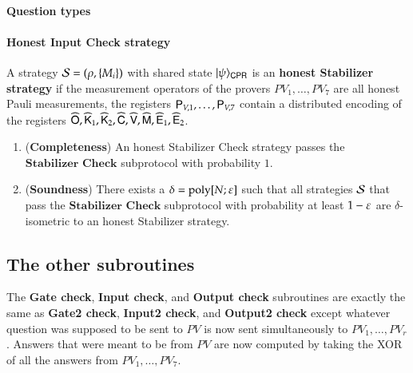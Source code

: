 
\paragraph{Question types} 

\paragraph{Honest Input Check strategy}
A strategy $\mathcal{S} = (\rho,\{M_i\})$ with shared state $|\psi\rangle_{{\mathsf{C}} {\mathsf{P}} {\mathsf{R}}}$ is an \textbf{honest Stabilizer strategy} if the measurement operators of the provers $PV_1,\ldots,PV_7$ are all honest Pauli measurements, the registers ${\mathsf{P}}_{V,1},\ldots,{\mathsf{P}}_{V,7}$ contain a distributed encoding of the registers $\widehat{{\mathsf{O}}}, \widehat{{\mathsf{K}}}_1,\widehat{{\mathsf{K}}}_2, \widehat{{\mathsf{C}}}, \widehat{{\mathsf{V}}}, \widehat{{\mathsf{M}}}, \widehat{{\mathsf{E}}}_1, \widehat{{\mathsf{E}}}_2$.



\begin{lemma}	
\label{lem:stabilizer_check}
\leavevmode
\begin{enumerate}
	\item (\textbf{Completeness}) An honest Stabilizer Check strategy passes the $\textbf{Stabilizer Check}$ subprotocol with probability $1$. 
	\item (\textbf{Soundness}) There exists a $\delta = \operatorname{poly}[N;\varepsilon]$ such that all strategies $\mathcal{S}$ that pass the $\textbf{Stabilizer Check}$ subprotocol with probability at least $1 - \varepsilon$ are $\delta$-isometric to an honest Stabilizer strategy.
\end{enumerate}
\end{lemma}


\subsection{The other subroutines}
The \textbf{Gate check}, \textbf{Input check}, and \textbf{Output check} subroutines are exactly the same as \textbf{Gate2 check}, \textbf{Input2 check}, and \textbf{Output2 check} except whatever question was supposed to be sent to $PV$ is now sent simultaneously to $PV_1,\ldots,PV_r$. Answers that were meant to be from $PV$ are now computed by taking the XOR of all the answers from $PV_1,\ldots,PV_7$. 


